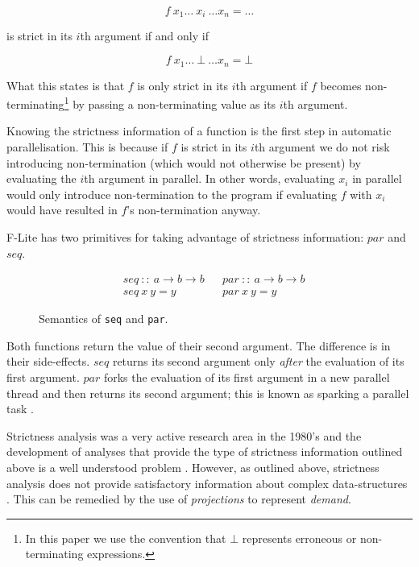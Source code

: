 $$
    f\ x_{1} \dots \ x_{i} \ \dots x_{n} = \dots
$$

\noindent is strict in its $i$th argument if and only if

$$
    f\ x_{1} \dots \ \bot \ \dots x_{n} = \bot
$$

What this states is that $f$ is only strict in its $i$th argument if $f$
becomes non-terminating\footnote{In this paper we use the convention that
$\bot$ represents erroneous or non-terminating expressions.} by passing a
non-terminating value as its $i$th argument.

Knowing the strictness information of a function is the first step in automatic
parallelisation. This is because if $f$ is strict in its $i$th argument we do
not risk introducing non-termination (which would not otherwise be present) by
evaluating the $i$th argument in parallel. In other words, evaluating $x_{i}$ in
parallel would only introduce non-termination to the program if evaluating $f$
with $x_{i}$ would have resulted in $f$'s non-termination anyway.

F-Lite has two primitives for taking advantage of strictness information: $par$
and $seq$.
\begin{figure}
\begin{align*}
    &seq \ :: \ a \rightarrow b \rightarrow b &&par \ :: \ a \rightarrow b \rightarrow b \\
    &seq \ x \ y = y                          &&par \ x \ y = y
\end{align*}
\caption{Semantics of \texttt{seq} and \texttt{par}.}
\label{fig:seqandpar}
\end{figure}

Both functions return the value of their second argument. The difference is in
their side-effects. $seq$ returns its second argument only \emph{after}
the evaluation of its first argument. $par$ forks the evaluation of its first
argument in a new parallel thread and then returns its second argument; this is
known as sparking a parallel task \citep{clack1986four}.

Strictness analysis was a very active research area in the 1980's and the
development of analyses that provide the type of strictness information
outlined above is a well understood problem \citep{mycroft1980theory,
clack1985strictness, burn1986strictness}.  However, as outlined above,
strictness analysis does not provide satisfactory information about complex
data-structures \citep{wadler1987strictness}. This can be remedied by the
use of \emph{projections} to represent \emph{demand}.

